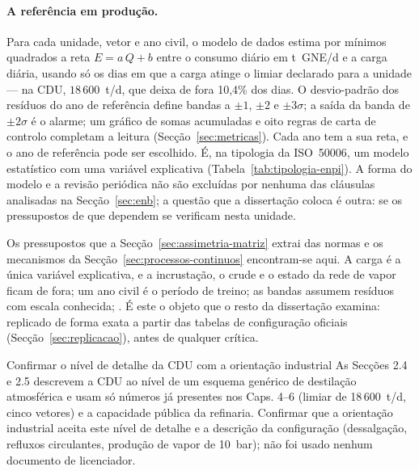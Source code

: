 \paragraph{A referência em produção.} Para cada unidade, vetor e ano civil,
o modelo de dados estima por mínimos quadrados a reta $E = a\,Q + b$ entre o
consumo diário em t~GNE/d e a carga diária, usando só os dias em que a carga
atinge o limiar declarado para a unidade --- na CDU, $18\,600$~t/d, que deixa de
fora 10,4\% dos dias. O desvio-padrão dos resíduos do ano de referência
define bandas a $\pm1$, $\pm2$ e $\pm3\sigma$; a saída da banda de $\pm2\sigma$
é o alarme; um gráfico de somas acumuladas e oito regras de carta de controlo
completam a leitura (Secção~\ref{sec:metricas}). Cada ano tem a sua reta, e o
ano de referência pode ser escolhido. É, na tipologia da ISO~50006, um modelo
estatístico com uma variável explicativa (Tabela~\ref{tab:tipologia-enpi}). A
forma do modelo e a revisão periódica não são excluídas por nenhuma das
cláusulas analisadas na Secção~\ref{sec:enb}; a questão que a dissertação
coloca é outra: se os pressupostos de que dependem se verificam nesta unidade.

Os pressupostos que a Secção~\ref{sec:assimetria-matriz} extrai das normas e
os mecanismos da Secção~\ref{sec:processos-continuos} encontram-se aqui. A
carga é a única variável explicativa, e a incrustação, o crude e o estado da
rede de vapor ficam de fora; um ano civil é o período de treino; as bandas
assumem resíduos com escala conhecida; . É este o objeto que o resto da dissertação examina: replicado de
forma exata a partir das tabelas de configuração oficiais
(Secção~\ref{sec:replicacao}), antes de qualquer crítica.

{Confirmar o nível de detalhe da CDU com a orientação industrial}
{As Secções 2.4 e 2.5 descrevem a CDU ao nível de um esquema genérico de
destilação atmosférica e usam só números já presentes nos Caps. 4--6
(limiar de 18\,600~t/d, cinco vetores) e a capacidade pública da refinaria.
Confirmar que a orientação industrial aceita este nível de detalhe e a
descrição da configuração (dessalgação, refluxos circulantes, produção de
vapor de 10~bar); não foi usado nenhum documento de licenciador.}%

